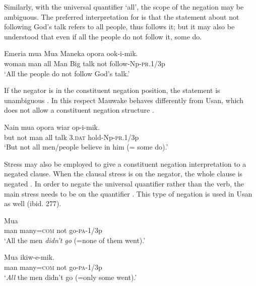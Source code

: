Similarly, with the universal quantifier  `all', the scope of the negation may be ambiguous. The preferred interpretation for  is that the statement about not following God's talk refers to all people, thus  follows it; but it may also be understood that even if all the people do not follow it, some do.

\ea%
\label{ex:6:x1148}
\gll Emeria  mua    Mua  Maneka  opora    ook-i-mik. \\
woman  man  all  Man  Big  talk  not  follow-Np-\textsc{pr}.1/3p\\
\glt `All the people do not follow God's talk.'
\z

If the negator is in the constituent negation position, the statement is unambiguous . In this respect Mauwake behaves differently from Usan, which does not allow a constituent negation structure \citep[275--277]{Reesink1987}.

\ea%
\label{ex:6:x1149}
\gll Nain    mua    opora  wiar  op-i-mik. \\
but  not  man  all  talk  3.\textsc{dat}  hold-Np-\textsc{pr}.1/3p\\
\glt `But not all men/people believe in him (= some do).'
\z

Stress may also be employed to give a constituent negation interpretation to a negated clause. When the clausal stress is on the negator, the whole clause is negated . In order to negate the universal quantifier rather than the verb, the main stress needs to be on the quantifier . This type of negation is used in Usan as well (ibid. 277).

\ea%
\label{ex:6:x669}
\gll Mua      \\
man  many=\textsc{com}  not  go-\textsc{pa}-1/3p\\
\glt `All the men \textit{didn't go} (=none of them went).'
\z

\ea%
\label{ex:6:x671}
\gll Mua     ikiw-e-mik. \\
man  many=\textsc{com}  not  go-\textsc{pa}-1/3p\\
\glt `\textit{All} the men didn't go (=only some went).'
\z


